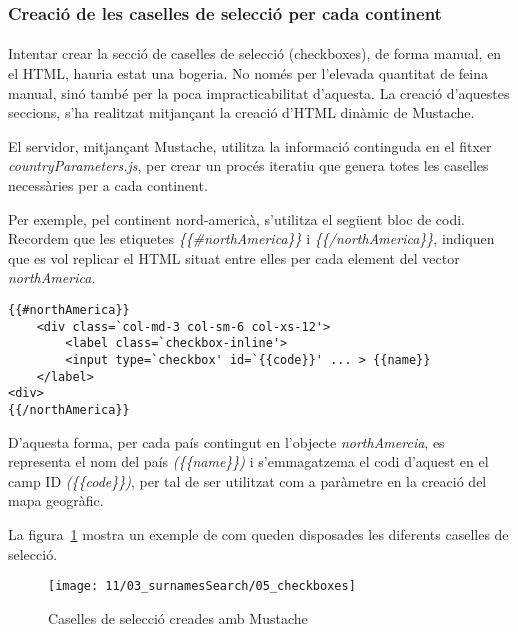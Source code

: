 \subsubsection{Creació de les caselles de selecció per cada continent}

\paragraph{}
Intentar crear la secció de caselles de selecció (checkboxes), de forma manual, en el HTML, hauria estat una bogeria. No només per l’elevada quantitat de feina manual, sinó també per la poca impracticabilitat d’aquesta. La creació d'aquestes seccions, s'ha realitzat mitjançant la creació d’HTML dinàmic de Mustache.

El servidor, mitjançant Mustache, utilitza la informació continguda en el fitxer \emph{countryParameters.js}, per crear un procés iteratiu que genera totes les caselles necessàries per a cada continent.

Per exemple, pel continent nord-americà, s'utilitza el següent bloc de codi. Recordem que les etiquetes \emph{\{\{\#northAmerica\}\}} i \emph{\{\{/northAmerica\}\}}, indiquen que es vol replicar el HTML situat entre elles per cada element del vector \emph{northAmerica}.

\begin{lstlisting}[style=rawOwn,caption={Caselles de selecció creades mitjançant Mustache}]
{{#northAmerica}}
    <div class=`col-md-3 col-sm-6 col-xs-12'>
        <label class=`checkbox-inline'>
        <input type=`checkbox' id=`{{code}}' ... > {{name}}
    </label>
<div>
{{/northAmerica}}
\end{lstlisting}

D'aquesta forma, per cada país contingut en l’objecte \emph{northAmercia}, es representa el nom del país \emph{(\{\{name\}\})}  i s'emmagatzema el codi d'aquest en el camp ID \emph{(\{\{code\}\})}, per tal de ser utilitzat com a paràmetre en la creació del mapa geogràfic.

La figura~\ref{fig:checkboxes} mostra un exemple de com queden disposades les diferents caselles de selecció.

\begin{figure}[h]
    \texttt{[image: 11/03\_surnamesSearch/05\_checkboxes]}
    \centering
    \caption{Caselles de selecció creades amb Mustache}\label{fig:checkboxes}
\end{figure}
